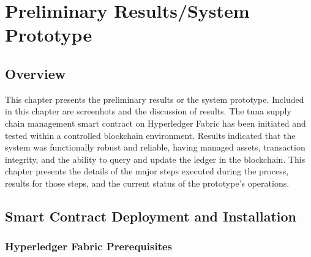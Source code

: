 \chapter{Preliminary Results/System Prototype}
\section{Overview}
This chapter  presents the preliminary results or the system prototype.  Included in this chapter are screenhots and the discussion of results. The tuna supply chain management smart contract on Hyperledger Fabric has been initiated and tested within a controlled blockchain environment. Results indicated that the system was functionally robust and reliable, having managed assets, transaction integrity, and the ability to query and update the ledger in the blockchain. This chapter presents the details of the major steps executed during the process, results for those steps, and the current status of the prototype's operations. 


\section{Smart Contract Deployment and Installation}

\subsection{Hyperledger Fabric Prerequisites}

